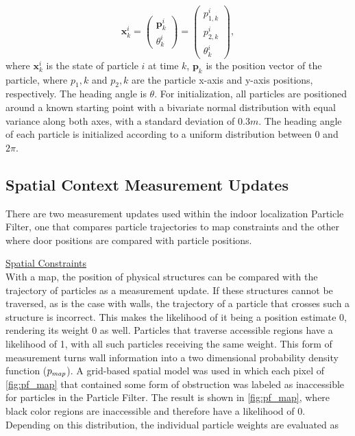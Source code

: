 \begin{equation}
\mathbf{x}_k^i = \left(\begin{array}{l}
	\mathbf{p}_{k}^i   \\
	\theta_k^i
\end{array}\right) = \left(\begin{array}{l}
p_{1,k}^i   \\
p_{2,k}^i  \\
\theta_k^i
\end{array}\right), 
\label{eq:pf_state}
\end{equation}
where $\mathbf{x}^i_k$ is the state of particle $i$ at time $k$, $\mathbf{p}_k$ is the position vector of the particle, where $p_1,k $ and $p_2,k$ are the particle x-axis and y-axis positions, respectively. The heading angle is  $\theta$. For initialization,  all particles are positioned around a known starting point with a bivariate normal  distribution with equal variance along both axes, with a standard deviation of $ 0.3 m $. The heading angle of each particle is initialized according to a uniform distribution between 0 and $ 2\pi $. \par 

\subsection{Spatial Context Measurement Updates}
	There are two measurement updates used within the indoor localization Particle Filter, one that compares particle trajectories to map constraints and the other where door positions are compared with particle positions. \par 
	
	\underline{Spatial Constraints}\\
   With a map, the position of physical structures can be compared with the trajectory of particles as a measurement update. If these structures cannot be traversed, as is the case with walls, the trajectory of a particle that crosses such a structure is incorrect. This makes the likelihood of it being a position estimate 0, rendering its weight 0 as well. Particles that traverse accessible regions have a likelihood of 1, with all such particles receiving the same weight. This form of measurement turns wall information into a two dimensional probability density function ($p_{\scaleto{map}{4pt}}$). A grid-based spatial model was used in which each pixel of \cref{fig:pf_map} that contained some form of obstruction was labeled as inaccessible for particles in the Particle Filter. The result is shown in \cref{fig:pf_map}, where black color regions are inaccessible and therefore have a likelihood of 0.\\
   Depending on this distribution, the individual particle weights are evaluated as 
   

